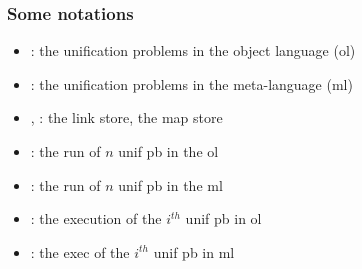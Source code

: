 \documentclass{pres}
\begin{document}
\begin{frame}
  \frametitle{Some notations}

  \begin{itemize}
    \item \foUnifPb: the unification problems in the object language (ol)
    \item \hoUnifPb: the unification problems in the meta-language (ml)
    \item \linkStore, \mapStore: the link store, the map store
  \end{itemize}

  \mysep

  \begin{itemize}
    \item {}: the run of $n$ unif pb in the ol
    \item {}: the run of $n$ unif pb in the ml
    \item {}: the execution of the $i^{th}$ unif pb in ol
    \item {}: the exec of the $i^{th}$ unif pb in ml
  \end{itemize}


\end{frame}
\end{document}
